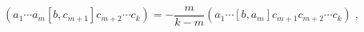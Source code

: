 \begin{equation}\label{sk3}
  (a_1\cdots a_m [b,c_{m+1}] c_{m+2} \cdots c_k) = - \frac{m}{k-m}(a_1 \cdots [b,a_m] c_{m+1} c_{m+2} \cdots c_k)\;, 
\end{equation}

